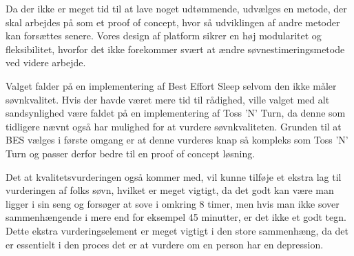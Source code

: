 Da der ikke er meget tid til at lave noget udtømmende, udvælges en metode, der skal arbejdes på som et proof of concept, hvor så udviklingen af andre metoder kan forsættes senere.
Vores design af platform sikrer en høj modularitet og fleksibilitet, hvorfor det ikke forekommer svært at ændre søvnestimeringsmetode ved videre arbejde.

Valget falder på en implementering af Best Effort Sleep selvom den ikke måler søvnkvalitet.
Hvis der havde været mere tid til rådighed, ville valget med alt sandsynlighed være faldet på en implementering af Toss 'N' Turn, da denne som tidligere nævnt også har mulighed for at vurdere søvnkvaliteten.
Grunden til at BES vælges i første omgang er at denne vurderes knap så kompleks som Toss 'N' Turn og passer derfor bedre til en proof of concept løsning.

Det at kvalitetsvurderingen også kommer med, vil kunne tilføje et ekstra lag til vurderingen af folks søvn, hvilket er meget vigtigt, da det godt kan være man ligger i sin seng og forsøger at sove i omkring 8 timer, men hvis man ikke sover sammenhængende i mere end for eksempel 45 minutter, er det ikke et godt tegn.
Dette ekstra vurderingselement er meget vigtigt i den store sammenhæng, da det er essentielt i den proces det er at vurdere om en person har en depression. 